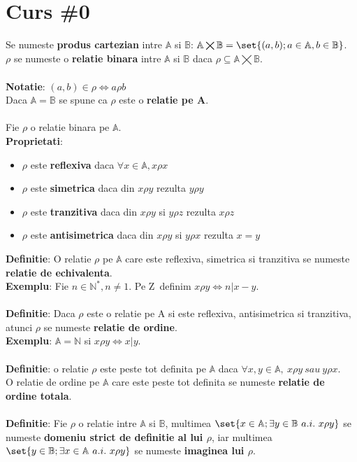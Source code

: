 \documentclass{article}
\newcommand{\A}{\mathbb A}
\newcommand{\B}{\mathbb B}
\newcommand{\Z}{\mathbb Z}
\newcommand{\Npos}{\mathbb{N}^{*}}
\newcommand{\N}{\mathbb{N}}
\begin{document}
\section{Curs \#0}
    Se numeste \textbf{produs cartezian} intre $\A$ si $\B$: $\A \bigtimes \B = \set{(a, b); a \in \A, b \in \B}$. \\
    $\rho$ se numeste o \textbf{relatie binara} intre $\A$ si $\B$ daca $\rho \subseteq \A \bigtimes \B$. \\ \\
    \textbf{Notatie}: $(a, b) \in \rho \iff a \rho b$\\
    Daca $\A = \B$ se spune ca $\rho$ este o \textbf{relatie pe \A}.\\ \\
    Fie $\rho$ o relatie binara pe $\A$. \\
    \textbf{Proprietati}:
    \begin{itemize}
        \item $\rho$ este \textbf{reflexiva} daca $\forall x \in \A, x \rho x$
        \item $\rho$ este \textbf{simetrica} daca din $x \rho y$ rezulta $y \rho y$
        \item $\rho$ este \textbf{tranzitiva} daca din $x \rho y$ si $y \rho z$ rezulta $x \rho z$
        \item $\rho$ este \textbf{antisimetrica} daca din $x \rho y$ si $y \rho x$ rezulta $x=y$
    \end{itemize}
    \textbf{Definitie}: O relatie $\rho$ pe $\A$ care este reflexiva, simetrica si tranzitiva se numeste \textbf{relatie de echivalenta}.\\
    \textbf{Exemplu}: Fie $n \in \Npos, n \neq 1$. Pe \Z\ definim $x \rho y \iff n | x-y$.\\ \\
    \textbf{Definitie}: Daca $\rho$ este o relatie pe A si este reflexiva, antisimetrica si tranzitiva, atunci $\rho$ se numeste \textbf{relatie de ordine}.\\
    \textbf{Exemplu}: $\A=\N$ si $x \rho y \iff x | y$.\\ \\
    \textbf{Definitie}: o relatie $\rho$ este peste tot definita pe $\A$ daca $\forall x,y \in \A,\ x\rho y\ sau\ y \rho x$. \\
    O relatie de ordine pe $\A$ care este peste tot definita se numeste \textbf{relatie de ordine totala}. \\ \\
    \textbf{Definitie}: Fie $\rho$ o relatie intre $\A$ si $\B$, multimea $\set{x \in \A; \exists y \in \B\ a.i.\ x \rho y}$ se numeste \textbf{domeniu strict de definitie al lui $\rho$}, iar multimea $\set{y \in \B; \exists x \in \A\ a.i.\ x \rho y}$ se numeste \textbf{imaginea lui $\rho$}. \\
\end{document}
